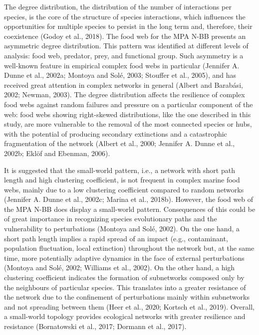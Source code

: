 \documentclass[
]{article}
\providecommand{\DIFadd}[1]{{\protect\color{blue}\uwave{#1}}} %
\providecommand{\DIFaddbegin}{} %
\providecommand{\DIFaddend}{} %
\newcommand{\DIFaddincludegraphics}[2][]{{\color{blue}\fbox{\DIFOincludegraphics[#1]{#2}}}} %
\DeclareRobustCommand{\DIFaddbegin}{\DIFOaddbegin \let\includegraphics\DIFaddincludegraphics} %
\DeclareRobustCommand{\DIFaddend}{\DIFOaddend \let\includegraphics\DIFOincludegraphics} %
\begin{document}
The degree distribution, the \DIFaddbegin \DIFadd{frequency }\DIFaddend distribution of the number of
interactions per species, is the core of the structure of species
interactions, which influences the opportunities for multiple species to
persist in the long term and, therefore, their coexistence (Godoy et
al., 2018). The food web for the MPA N-BB presents an asymmetric degree
distribution. This pattern was identified at different levels of
analysis: food web, predator, prey, and functional group. Such asymmetry
is a well-known feature in empirical complex food webs in particular
(Jennifer A. Dunne et al., 2002a; Montoya and Solé, 2003; Stouffer et
al., 2005), and has received great attention in complex networks in
general (Albert and Barabási, 2002; Newman, 2003). The degree
distribution affects the resilience of complex food webs against random
failures and pressure on a particular component of the web: food webs
showing right-skewed distributions, like the one described in this
study, are more vulnerable to the removal of the most connected species
or hubs, with the potential of producing secondary extinctions and a
catastrophic fragmentation of the network (Albert et al., 2000; Jennifer
A. Dunne et al., 2002b; Eklöf and Ebenman, 2006).

It is suggested that the small-world pattern, i.e., a network with short
path length and high clustering coefficient, is not frequent in complex
marine food webs, mainly due to a low clustering coefficient compared to
random networks (Jennifer A. Dunne et al., 2002c; Marina et al., 2018b).
However, the food web of the MPA N-BB does display a small-world
pattern. Consequences of this could be of great importance in
recognizing species evolutionary paths and the vulnerability to
perturbations (Montoya and Solé, 2002). On the one hand, a short path
length implies a rapid spread of an impact (e.g., contaminant,
population fluctuation, local extinction) throughout the network but, at
the same time, more potentially adaptive dynamics in the face of
external perturbations (Montoya and Solé, 2002; Williams et al., 2002).
On the other hand, a high clustering coefficient indicates the formation
of subnetworks composed only by the neighbours of particular species.
This translates into a greater resistance of the network due to the
confinement of perturbations mainly within subnetworks and not spreading
between them (Heer et al., 2020; Kortsch et al., 2019). Overall, a
small-world topology provides ecological networks with greater
resilience and resistance (Bornatowski et al., 2017; Dormann et al.,
2017).
\end{document}
